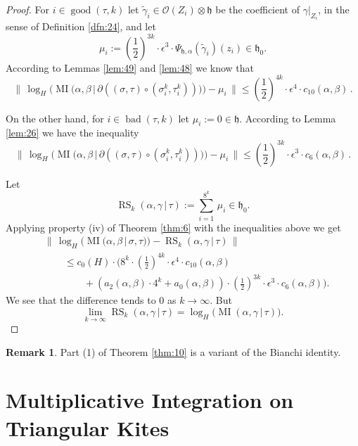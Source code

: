 \documentclass[10pt, a4paper]{amsart}
\theoremstyle{definition}
\newtheorem{rem}[equation]{Remark}
\numberwithin{equation}{section}
\newcommand{\opn}{\operatorname}
\newcommand{\mfrak}[1]{\mathfrak{#1}}
\newcommand{\mcal}[1]{\mathcal{#1}}
\newcommand{\smfrac}[2]{{\textstyle \frac{#1}{#2}}}
\newcommand{\tup}[1]{\textup{#1}}
\newcommand{\til}[1]{\tilde{#1}}
\newcommand{\Norm}[1]{\bigl\lVert\, #1 \, \bigr\rVert}
\renewcommand{\vert}{\, | \,}
\newcommand{\h}{\mfrak{h}}
\begin{document}
\begin{proof}
For $i \in \opn{good}(\tau, k)$ let
$\til{\gamma}_i \in \mcal{O}(Z_i) \otimes \h$ be the coefficient of 
$\gamma|_{Z_i}$, in the sense of Definition \tup{\ref{dfn:24}}, 
and let
\[ \mu_i := (\smfrac{1}{2})^{3k} \cdot \epsilon^3 \cdot 
\Psi_{\h, \alpha}(\til{\gamma}_i)(z_i) \in \h_0  . \]
According to Lemmas \ref{lem:49} and \ref{lem:48} we know that 
\[ \Norm{ \log_H \bigl( \opn{MI} \bigl(\alpha, \beta \vert 
\partial ( (\sigma, \tau) \circ (\sigma^k_i, \tau^k_i) ) \bigr) \bigr)
- \mu_i } \leq 
(\smfrac{1}{2})^{4k} \cdot \epsilon^4 \cdot c_{10}(\alpha, \beta) \, .\]

On the other hand, for $i \in \opn{bad}(\tau, k)$ let
$\mu_i := 0 \in \h$. 
According to Lemma \ref{lem:26} we have the inequality
\[ \Norm{ \log_H \bigl( \opn{MI} \bigl(\alpha, \beta \vert 
\partial ( (\sigma, \tau) \circ (\sigma^k_i, \tau^k_i) ) \bigr) \bigr)
- \mu_i } \leq 
(\smfrac{1}{2})^{3k} \cdot \epsilon^3 \cdot c_6(\alpha, \beta) \, .\]

Let 
\[ \opn{RS}_k(\alpha, \gamma \vert \tau) := 
\sum_{i = 1}^{8^k} \, \mu_i \in \h_0 . \]
Applying property (iv) of Theorem \ref{thm:6} with the inequalities above we
get
\[ \begin{aligned}
& \Norm{ \log_H \bigl( \opn{MI} \bigl(\alpha, \beta \vert \sigma, \tau \bigr)
\bigr) - \opn{RS}_k(\alpha, \gamma \vert \tau) } \\
& \qquad \leq 
c_0(H) \cdot \bigl( 
8^k \cdot (\smfrac{1}{2})^{4k} \cdot \epsilon^4 \cdot c_{10}(\alpha, \beta) 
\\
& \qquad \qquad +
(a_2(\alpha, \beta) \cdot 4^k + a_0(\alpha, \beta)) \cdot 
(\smfrac{1}{2})^{3k} \cdot \epsilon^3 \cdot c_6(\alpha, \beta) \bigr) .
\end{aligned} \]
We see that the difference tends to $0$ as $k \to \infty$. But
\[ \lim_{k \to  \infty} \opn{RS}_k(\alpha, \gamma \vert \tau) = 
\log_H \bigl( \opn{MI}(\alpha, \gamma \vert \tau) \bigr) . \]
\end{proof}

\begin{rem}
Part (1) of Theorem \ref{thm:10} is a variant of the Bianchi identity.
\end{rem}












\cleardoublepage
\section{Multiplicative Integration on Triangular Kites}
\label{sec:simpl}
\end{document}
